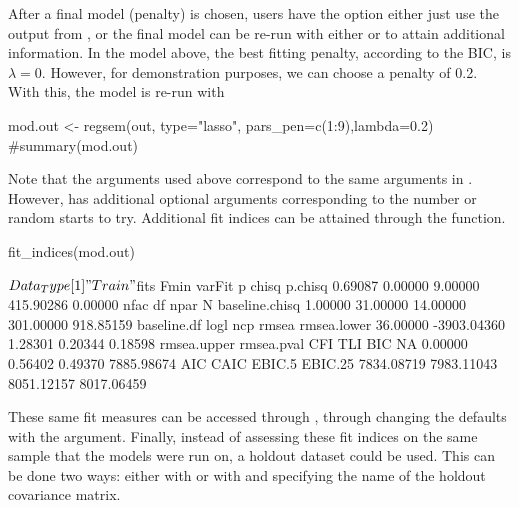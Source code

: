 \documentclass[article]{jss}
\begin{document}
After a final model (penalty) is chosen, users have the option either
just use the output from , or the final model can be
re-run with either  or  to attain
additional information. In the model above, the best fitting penalty,
according to the BIC, is \(\lambda=0\). However, for demonstration
purposes, we can choose a penalty of 0.2. With this, the model is re-run
with 

\begin{CodeChunk}
\begin{CodeInput}
mod.out <- regsem(out, type="lasso", pars_pen=c(1:9),lambda=0.2)
#summary(mod.out)
\end{CodeInput}
\end{CodeChunk}

Note that the arguments used above correspond to the same arguments in
. However,  has additional
optional arguments corresponding to the number or random starts to try.
Additional fit indices can be attained through the 
function.

\begin{CodeChunk}
\begin{CodeInput}
fit_indices(mod.out)
\end{CodeInput}
\begin{CodeOutput}
$Data_Type
[1] "Train"

$fits
          Fmin         varFit              p          chisq        p.chisq 
       0.69087        0.00000        9.00000      415.90286        0.00000 
          nfac             df           npar              N baseline.chisq 
       1.00000       31.00000       14.00000      301.00000      918.85159 
   baseline.df           logl            ncp          rmsea    rmsea.lower 
      36.00000    -3903.04360        1.28301        0.20344        0.18598 
   rmsea.upper     rmsea.pval            CFI            TLI            BIC 
            NA        0.00000        0.56402        0.49370     7885.98674 
           AIC           CAIC         EBIC.5        EBIC.25 
    7834.08719     7983.11043     8051.12157     8017.06459 
\end{CodeOutput}
\end{CodeChunk}

\noindent
These same fit measures can be accessed through ,
through changing the defaults with the 
argument. Finally, instead of assessing these fit indices on the same
sample that the models were run on, a holdout dataset could be used.
This can be done two ways: either with
 or with
 and specifying the name of the
holdout covariance matrix.
\end{document}
